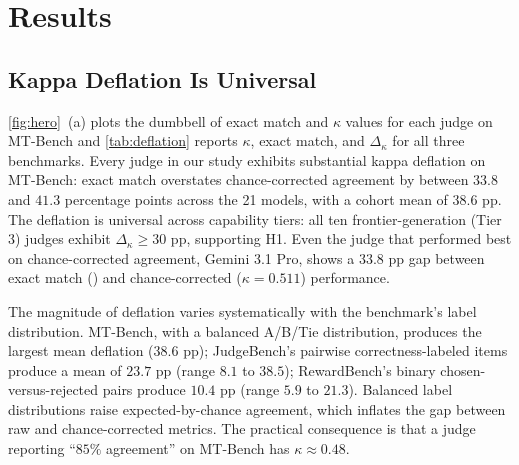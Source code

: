 \documentclass[11pt]{article}
\begin{document}
\section{Results}
\label{sec:results}

\subsection{Kappa Deflation Is Universal}


\autoref{fig:hero}~(a) plots the dumbbell of exact match and $\kappa$ values for each judge on MT-Bench and \autoref{tab:deflation} reports $\kappa$, exact match, and $\Delta_\kappa$ for all three benchmarks. Every judge in our study exhibits substantial kappa deflation on MT-Bench: exact match overstates chance-corrected agreement by between $33.8$ and $41.3$ percentage points across the 21 models, with a cohort mean of $38.6$ pp. The deflation is universal across capability tiers: all ten frontier-generation (Tier 3) judges exhibit $\Delta_\kappa \geq 30$ pp, supporting H1. Even the judge that performed best on chance-corrected agreement, Gemini 3.1 Pro, shows a $33.8$ pp gap between exact match () and chance-corrected ($\kappa = 0.511$) performance. 

The magnitude of deflation varies systematically with the benchmark's label distribution. MT-Bench, with a balanced A/B/Tie distribution, produces the largest mean deflation ($38.6$ pp); JudgeBench's pairwise correctness-labeled items produce a mean of $23.7$ pp (range $8.1$ to $38.5$); RewardBench's binary chosen-versus-rejected pairs produce $10.4$ pp (range $5.9$ to $21.3$). Balanced label distributions raise expected-by-chance agreement, which inflates the gap between raw and chance-corrected metrics. The practical consequence is that a judge reporting ``$85\%$ agreement'' on MT-Bench has $\kappa \approx 0.48$. 
\end{document}
